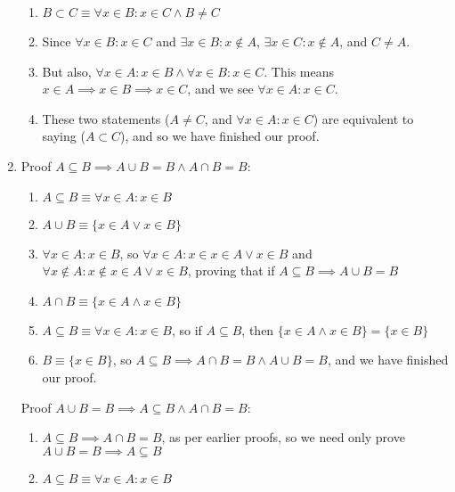 \documentclass{article}
\begin{document}
\begin{enumerate}
\begin{enumerate}
                \item $B \subset C \equiv \forall x \in B: x \in C \land B \neq C$
                \item Since $\forall x \in B: x \in C$ and $\exists x \in B: x
                    \notin A$, $\exists x \in C: x \notin A$, and $C \neq A$.
                \item But also, $\forall x \in A: x \in B \land \forall x \in B: x \in C$. This
                    means $x \in A \implies x \in B \implies x \in C$, and we see $\forall x \in A: x \in C$.
                \item These two statements ($A \neq C$, and $\forall x \in A: x \in C$) are equivalent
                    to saying ($A \subset C$), and so we have finished our proof.
            \end{enumerate}
        \item Proof $A \subseteq B \implies A \cup B = B \land A \cap B = B$:
            \begin{enumerate}
                \item $A \subseteq B \equiv \forall x \in A: x \in B$
                \item $A \cup B \equiv \{x \in A \lor x \in B\}$
                \item $\forall x \in A: x \in B$, so $\forall x \in A : x \in
                    {x \in A \lor x \in B}$ and $\forall x \notin A : x \notin
                    {x \in A \lor x \in B}$, proving that if $A \subseteq B
                    \implies A \cup B = B$
                \item $A \cap B \equiv \{x \in A \land x \in B\}$
                \item $A \subseteq B \equiv \forall x \in A: x \in B$, so if $A \subseteq B$, then
                    $\{x \in A \land x \in B\} = \{x \in B\}$
                \item $B \equiv \{x \in B\}$, so $A \subseteq B \implies A \cap
                    B = B \land A \cup B = B$, and we have finished our proof.
            \end{enumerate}
            Proof $A \cup B = B \implies A \subseteq B \land A \cap B = B$:
            \begin{enumerate}
                \item $A \subseteq B \implies A \cap B = B$, as per earlier
                    proofs, so we need only prove $A \cup B = B \implies A
                    \subseteq B$
                \item $A \subseteq B \equiv \forall x \in A: x \in B$

\end{enumerate}
\end{enumerate}
\end{document}

